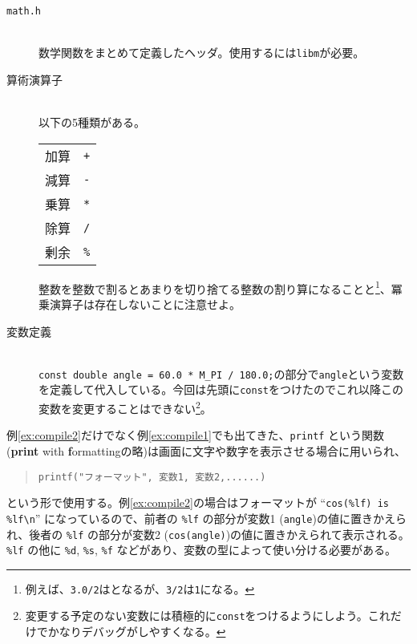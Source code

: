 \begin{description}
    \item[\texttt{math.h}] \mbox{}\\
          数学関数をまとめて定義したヘッダ。使用するには\texttt{libm}が必要。
    \item[算術演算子] \mbox{} \\
          以下の5種類がある。
          \begin{table}[H]
              \centering
              \begin{tabular}{ll}
                  加算 & \texttt{+}  \\
                  減算 & \texttt{-}  \\
                  乗算 & \texttt{*}  \\
                  除算 & \texttt{/}  \\
                  剰余 & \texttt{\%}
              \end{tabular}
          \end{table} \noindent
          整数を整数で割るとあまりを切り捨てる整数の割り算になることと\footnote{例えば、\texttt{3.0/2}はとなるが、\texttt{3/2}は\texttt{1}になる。}、冪乗演算子は存在しないことに注意せよ。
    \item[変数定義] \mbox{}\\
          \texttt{const double angle = 60.0 * M\_PI / 180.0;}の部分で\texttt{angle}という変数を定義して代入している。今回は先頭に\texttt{const}をつけたのでこれ以降この変数を変更することはできない\footnote{変更する予定のない変数には積極的に\texttt{const}をつけるようにしよう。これだけでかなりデバッグがしやすくなる。}。
\end{description}
例\ref{ex:compile2}だけでなく例\ref{ex:compile1}でも出てきた、\texttt{printf} という関数(\textbf{print} with \textbf{f}ormattingの略)は画面に文字や数字を表示させる場合に用いられ、
\begin{quote}
    \begin{verbatim}
printf("フォーマット", 変数1, 変数2,......)
\end{verbatim}
\end{quote}
という形で使用する。例\ref{ex:compile2}の場合はフォーマットが ``\texttt{cos(\%lf) is \%lf\textbackslash n}'' になっているので、前者の \texttt{\%lf} の部分が変数1 (\texttt{angle})の値に置きかえられ、後者の \texttt{\%lf} の部分が変数2 (\texttt{cos(angle)})の値に置きかえられて表示される。\texttt{\%lf} の他に \texttt{\%d}, \texttt{\%s}, \texttt{\%f} などがあり、変数の型によって使い分ける必要がある。
